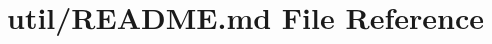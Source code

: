 \hypertarget{util_2_r_e_a_d_m_e_8md}{}\section{util/\+R\+E\+A\+D\+ME.md File Reference}
\label{util_2_r_e_a_d_m_e_8md}
